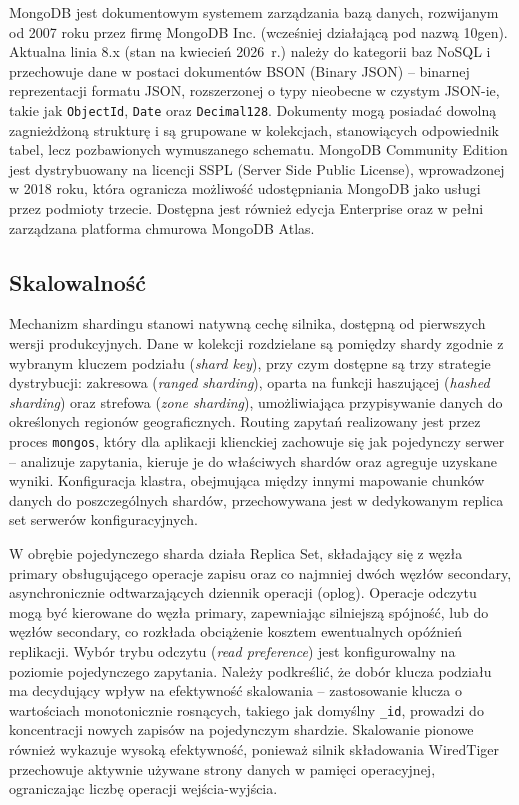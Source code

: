 MongoDB jest dokumentowym systemem zarządzania bazą danych, rozwijanym od 2007
roku przez firmę MongoDB Inc. (wcześniej działającą pod nazwą 10gen). Aktualna
linia 8.x (stan na kwiecień 2026~r.) należy do kategorii baz NoSQL i przechowuje
dane w postaci dokumentów BSON (Binary JSON) -- binarnej reprezentacji formatu
JSON, rozszerzonej o typy nieobecne w czystym JSON-ie, takie jak
\texttt{ObjectId}, \texttt{Date} oraz \texttt{Decimal128}. Dokumenty mogą
posiadać dowolną zagnieżdżoną strukturę i są grupowane w kolekcjach,
stanowiących odpowiednik tabel, lecz pozbawionych wymuszanego schematu.
MongoDB Community Edition jest dystrybuowany na licencji SSPL (Server Side
Public License), wprowadzonej w 2018 roku, która ogranicza możliwość
udostępniania MongoDB jako usługi przez podmioty trzecie. Dostępna jest
również edycja Enterprise oraz w pełni zarządzana platforma chmurowa
MongoDB Atlas.

\subsection{Skalowalność}

Mechanizm shardingu stanowi natywną cechę silnika, dostępną od pierwszych
wersji produkcyjnych. Dane w kolekcji rozdzielane są pomiędzy shardy zgodnie
z wybranym kluczem podziału (\textit{shard key}), przy czym dostępne są trzy
strategie dystrybucji: zakresowa (\textit{ranged sharding}), oparta na funkcji
haszującej (\textit{hashed sharding}) oraz strefowa (\textit{zone sharding}),
umożliwiająca przypisywanie danych do określonych regionów geograficznych.
Routing zapytań realizowany jest przez proces \texttt{mongos}, który dla
aplikacji klienckiej zachowuje się jak pojedynczy serwer -- analizuje
zapytania, kieruje je do właściwych shardów oraz agreguje uzyskane wyniki.
Konfiguracja klastra, obejmująca między innymi mapowanie chunków danych do
poszczególnych shardów, przechowywana jest w dedykowanym replica set serwerów
konfiguracyjnych.

W obrębie pojedynczego sharda działa Replica Set, składający się z węzła
primary obsługującego operacje zapisu oraz co najmniej dwóch węzłów secondary,
asynchronicznie odtwarzających dziennik operacji (oplog). Operacje odczytu
mogą być kierowane do węzła primary, zapewniając silniejszą spójność, lub do
węzłów secondary, co rozkłada obciążenie kosztem ewentualnych opóźnień
replikacji. Wybór trybu odczytu (\textit{read preference}) jest konfigurowalny
na poziomie pojedynczego zapytania. Należy podkreślić, że dobór klucza
podziału ma decydujący wpływ na efektywność skalowania -- zastosowanie klucza
o wartościach monotonicznie rosnących, takiego jak domyślny \texttt{\_id},
prowadzi do koncentracji nowych zapisów na pojedynczym shardzie. Skalowanie
pionowe również wykazuje wysoką efektywność, ponieważ silnik składowania
WiredTiger przechowuje aktywnie używane strony danych w pamięci operacyjnej,
ograniczając liczbę operacji wejścia-wyjścia.

